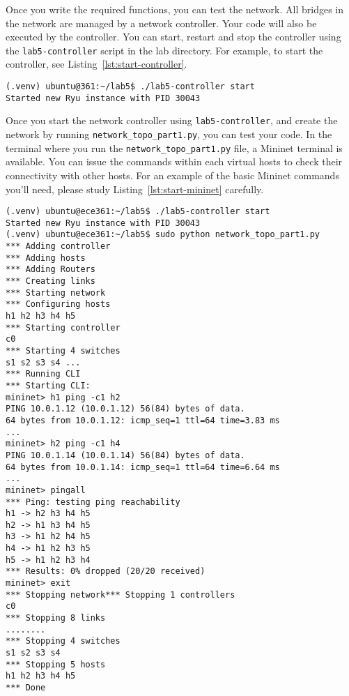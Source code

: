 \documentclass[11pt]{article}
\begin{document}
Once you write the required functions, you can test the network.
All bridges in the network are managed by a network controller. Your code will also be executed by the controller. You can start, restart and stop the controller using the \texttt{lab5-controller} script in the lab directory. For example, to start the controller, see Listing~\ref{lst:start-controller}.


\begin{lstlisting}[style=ece361shell, caption={Sample output when starting the network controller.}, label={lst:start-controller}]
(.venv) ubuntu@361:~/lab5$ ./lab5-controller start
Started new Ryu instance with PID 30043
\end{lstlisting}

Once you start the network controller using \texttt{lab5-controller}, and create the network by running \texttt{network\_topo\_part1.py}, you can test your code.
In the terminal where you run the \texttt{network\_topo\_part1.py} file, a Mininet terminal is available. You can issue the commands within each virtual hosts to check their connectivity with other hosts. For an example of the basic Mininet commands you'll need, please study Listing~\ref{lst:start-mininet} carefully.

\begin{lstlisting}[style=ece361shell, caption={Sample workflow for creating the topology in part 1 and testing the code.}, label={lst:start-mininet}]
(.venv) ubuntu@ece361:~/lab5$ ./lab5-controller start
Started new Ryu instance with PID 30043
(.venv) ubuntu@ece361:~/lab5$ sudo python network_topo_part1.py
*** Adding controller
*** Adding hosts
*** Adding Routers
*** Creating links
*** Starting network
*** Configuring hosts
h1 h2 h3 h4 h5
*** Starting controller
c0
*** Starting 4 switches
s1 s2 s3 s4 ...
*** Running CLI
*** Starting CLI:
mininet> h1 ping -c1 h2
PING 10.0.1.12 (10.0.1.12) 56(84) bytes of data.
64 bytes from 10.0.1.12: icmp_seq=1 ttl=64 time=3.83 ms
...
mininet> h2 ping -c1 h4
PING 10.0.1.14 (10.0.1.14) 56(84) bytes of data.
64 bytes from 10.0.1.14: icmp_seq=1 ttl=64 time=6.64 ms
...
mininet> pingall
*** Ping: testing ping reachability
h1 -> h2 h3 h4 h5
h2 -> h1 h3 h4 h5
h3 -> h1 h2 h4 h5
h4 -> h1 h2 h3 h5
h5 -> h1 h2 h3 h4
*** Results: 0% dropped (20/20 received)
mininet> exit
*** Stopping network*** Stopping 1 controllers
c0
*** Stopping 8 links
........
*** Stopping 4 switches
s1 s2 s3 s4
*** Stopping 5 hosts
h1 h2 h3 h4 h5
*** Done
\end{lstlisting}
\end{document}
